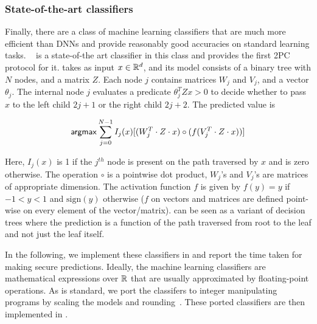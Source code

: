 \subsubsection*{State-of-the-art classifiers}
Finally, there are a class of machine learning classifiers that are
much more efficient than
DNNs and provide reasonably good accuracies on standard learning
tasks. \bonsai~\cite{bonsai} is a state-of-the art classifier in this
class and \tool provides the first 2PC protocol for it.
\bonsai takes as input $x \in {\mathbb{R}}^d$, and its model consists of a
binary tree with $N$ nodes, and a matrix $Z$. Each node $j$ contains
matrices $W_j$ and $V_j$, and a vector $\theta_{j}$. The internal node
$j$  evaluates a predicate $\theta_j^TZx > 0$ to decide whether
to pass $x$ to the left child $2j+1$ or the right child $2j+2$.
The predicted value is

\[
{\sf argmax} \sum_{j = 0}^{N - 1} I_j(x)[ (W_j^T\cdot Z\cdot x) \circ (f(V_j^T\cdot Z\cdot x))] 
\]

Here, $I_j(x)$ is 1 if the $j^{th}$ node is present on the path traversed by $x$
and is zero otherwise. 
The operation $\circ$ is a pointwise dot product, $W_j$'s and $V_j$'s
are matrices of appropriate dimension. The activation function $f$ is given by $f(y) = y$ if
$-1 < y < 1$ and $\mathrm{sign}(y)$ otherwise ($f$ on vectors and matrices are defined point-wise on every element of the vector/matrix). \bonsai can be
seen as a variant of decision trees where the prediction is a function
of the path traversed from root to the leaf and not just the leaf
itself.

In the following, we implement these classifiers in \tool and report
the time taken for making secure predictions. Ideally, the machine
learning classifiers are mathematical expressions over ${\mathbb{R}}$ that are
usually approximated by floating-point operations. 
As is standard, we port the classifers to integer manipulating
programs by scaling the models and rounding~\cite{minionn}. These
ported classifiers are then implemented in \tool.

